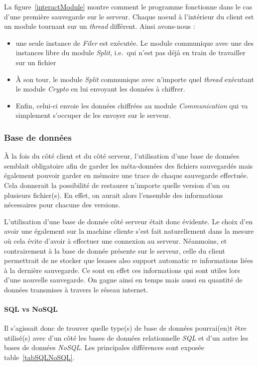 \documentclass[a4paper,10pt, twoside]{report}
\begin{document}
\begin{spacing}{1.2}
La figure~\ref{interactModule} montre comment le programme fonctionne dans le
cas d'une premi\`ere sauvegarde sur le serveur. Chaque noeud \`a l'int\'erieur
du client est un module tournant sur un \textit{thread} diff\'erent. Ainsi
avons-nous :
\begin{itemize}
 \item une seule instance de \textit{Filer} est ex\'ecut\'ee. Le module
 communique avec une des instances libre du module \textit{Split}, i.e.~qui
 n'est pas d\'ej\`a en train de travailler sur un fichier
 \item \`A son tour, le module \textit{Split} communique avec n'importe quel
 \textit{thread} ex\'ecutant le module \textit{Crypto} en lui envoyant les
 donn\'ees \`a chiffrer.
 \item Enfin, celui-ci envoie les donn\'ees chiffr\'ees au module
 \textit{Communication} qui va simplement s'occuper de les envoyer sur le
 serveur.
\end{itemize}

\subsubsection{Base de donn\'ees}
\`A la fois du c\^ot\'e client et du c\^ot\'e serveur, l'utilisation d'une
base de donn\'ees semblait obligatoire afin de garder les m\'eta-donn\'ees
des fichiers sauvegard\'es mais \'egalement pouvoir garder en m\'emoire une
trace de chaque sauvegarde effectu\'ee. Cela donnerait la possibilit\'e
de restaurer n'importe quelle version d'un ou plusieurs fichier(s). En effet,
on aurait alors l'ensemble des informations n\'ecessaires pour chacune des
versions.

L'utilisation d'une base de donn\'ee c\^ot\'e serveur \'etait donc \'evidente.
Le choix d'en avoir une \'egalement sur la machine cliente s'est fait
naturellement dans la mesure o\`u cela \'evite d'avoir \`a effectuer une
connexion au serveur. N\'eanmoins, et contrairement \`a la base de donn\'ee
pr\'esente sur le serveur, celle du client permettrait de ne stocker que lesases also support automatic re
informations li\'ees \`a la derni\`ere sauvegarde. Ce sont en effet ces
informations qui sont utiles lors d'une nouvelle sauvegarde. On gagne ainsi en
temps mais aussi en quantit\'e de donn\'ees transmises \`a travers le r\'eseau
internet.

\paragraph{SQL vs NoSQL}
Il s'agissait donc de trouver quelle type(s) de base de donn\'ees pourrai(en)t
\^etre utilis\'e(s) avec d'un c\^ot\'e les bases de donn\'ees relationnelle
\textit{SQL} et d'un autre les bases de donn\'ees \textit{NoSQL}. Les
principales diff\'erences sont expos\'ee table~\ref{tabSQLNoSQL}.


\end{spacing}
\end{document}
